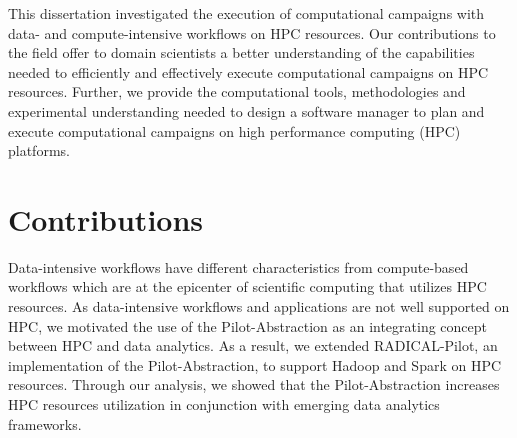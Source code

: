 \label{ch:conclusions}

This dissertation investigated the execution of computational campaigns with
data- and compute-intensive workflows on HPC resources. Our contributions to the
field offer to domain scientists a better understanding of the capabilities
needed to efficiently and effectively execute computational campaigns on HPC
resources. Further, we provide the computational tools, methodologies and
experimental understanding needed to design a software manager to plan and
execute computational campaigns on high performance computing (HPC) platforms.

\section{Contributions}

Data-intensive workflows have different characteristics from compute-based
workflows which are at the epicenter of scientific computing that utilizes HPC
resources. As
data-intensive workflows and applications are not well supported on HPC, we
motivated the use of the Pilot-Abstraction as an integrating concept between HPC
and data analytics. As a result, we extended RADICAL-Pilot, an implementation of
the Pilot-Abstraction, to support Hadoop and Spark on HPC resources. Through our
analysis, we showed that the Pilot-Abstraction increases HPC resources
utilization in conjunction with emerging data analytics frameworks.

